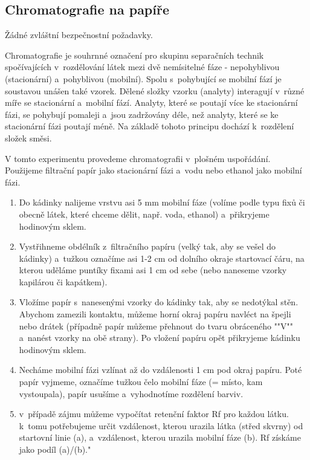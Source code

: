 \subsection{Chromatografie na papíře}


Žádné zvláštní bezpečnostní požadavky.

\hspace{-21px} 

Chromatografie je souhrnné označení pro skupinu separačních technik spočívajících v~rozdělování látek mezi dvě nemísitelné fáze - nepohyblivou (stacionární) a~pohyblivou (mobilní). Spolu s~pohybující se mobilní fází je soustavou unášen také vzorek. Dělené složky vzorku (analyty) interagují v~různé míře se stacionární a~mobilní fází. Analyty, které se poutají více ke stacionární fázi, se pohybují pomaleji a~jsou zadržovány déle, než analyty, které se ke stacionární fázi poutají méně. Na základě tohoto principu dochází k~rozdělení složek směsi.

V tomto experimentu provedeme chromatografii v~plošném uspořádání. Použijeme filtrační papír jako stacionární fázi a~vodu nebo ethanol jako mobilní fázi. \newline

\hspace{-21px} 

\begin{enumerate}
\item Do kádinky nalijeme vrstvu asi 5 mm mobilní fáze (volíme podle typu fixů či obecně látek, které chceme dělit, např. voda, ethanol) a~přikryjeme hodinovým sklem.
\item Vystřihneme obdélník z~filtračního papíru (velký tak, aby se vešel do kádinky) a~tužkou označíme asi 1-2 cm od dolního okraje startovací čáru, na kterou uděláme puntíky fixami asi 1 cm od sebe (nebo naneseme vzorky kapilárou či kapátkem).
\item Vložíme papír s~nanesenými vzorky do kádinky tak, aby se nedotýkal stěn. Abychom zamezili kontaktu, můžeme horní okraj papíru navléct na špejli nebo drátek (případně papír můžeme přehnout do tvaru obráceného ""V"" a~nanést vzorky na obě strany). Po vložení papíru opět přikryjeme kádinku hodinovým sklem.
\item Necháme mobilní fázi vzlínat až do vzdálenosti 1 cm pod okraj papíru. Poté papír vyjmeme, označíme tužkou čelo mobilní fáze (= místo, kam vystoupala), papír usušíme a~vyhodnotíme rozdělení barviv.
\item v~případě zájmu můžeme vypočítat retenční faktor Rf pro každou látku. k~tomu potřebujeme určit vzdálenost, kterou urazila látka (střed skvrny) od startovní linie (a), a~vzdálenost, kterou urazila mobilní fáze (b). Rf získáme jako podíl (a)/(b)."
\end{enumerate}
